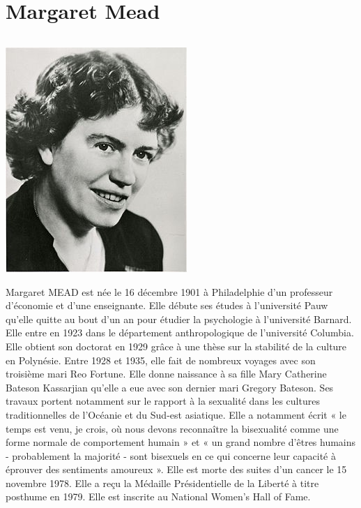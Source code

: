 \part{Margaret Mead}
\paragraph{}
\begin{center}
\includegraphics[scale=7]{MMead.jpg}
\end{center}
 Margaret MEAD est née le 16 décembre 1901 à Philadelphie d’un professeur d’économie et d’une enseignante. Elle débute ses études à l’université Pauw qu’elle quitte au bout d’un an pour étudier la psychologie à l’université Barnard. Elle entre en 1923 dans le département anthropologique de l’université Columbia. Elle obtient son doctorat en 1929 grâce à une thèse sur la stabilité de la culture en Polynésie. Entre 1928 et 1935, elle fait de nombreux voyages avec son troisième mari Reo Fortune. Elle donne naissance à sa fille Mary Catherine Bateson Kassarjian qu’elle a eue avec son dernier mari Gregory Bateson. Ses travaux portent notamment sur le rapport à la sexualité dans les cultures traditionnelles de l’Océanie et du Sud-est asiatique. Elle a notamment écrit «  le temps est venu, je crois, où nous devons reconnaître la bisexualité comme une forme normale de comportement humain » et «  un grand nombre d'êtres humains - probablement la majorité - sont bisexuels en ce qui concerne leur capacité à éprouver des sentiments amoureux ». Elle est morte des suites d’un cancer le 15 novembre 1978. Elle a reçu la Médaille Présidentielle de la Liberté à titre posthume en 1979. Elle est inscrite au National Women’s Hall of Fame.